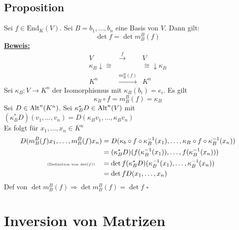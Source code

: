 \subsection{Proposition} %
\label{sub:proposition}
Sei $f \in \text{End}_K (V)$. Sei $B= b_1, \ldots , b_n$ eine Basis von $V$. Dann gilt:
\[
	\det f = \det m_B^B(f)
\]
\underline{\textbf{Beweis:}} \\
\[
	\begin{matrix}
		V & \xrightarrow{f} & V \\
		\kappa_B \downarrow \cong & & \cong \downarrow \kappa_B \\
		K^n & \xrightarrow{m_B^B(f)} & K^n
	\end{matrix}
\]
Sei $ \kappa_B : V \to K^n$ der Isomorphismus mit $\kappa_B (b_i)= e_i$. Es gilt
\[
	\kappa_B \circ f = m_B^B(f)= \kappa_B
\]
Sei $ D \in \operatorname{Alt}^n(K^n)$. Sei $\kappa_B^*D \in \operatorname{Alt}^n(V)$ mit $(\kappa_B^*D)(v_1, \ldots , v_n)= D(\kappa_B v_1, \ldots , \kappa_B v_n)$ \\
Es folgt für $x_1, \ldots , x_n \in K^n$
\begin{align*}
	D( m_B^B(f) x_1, \ldots , m_B^B(f)x_n) &= D(\kappa_b \circ f \circ \kappa_B^{-1}(x_1), \ldots , \kappa_B \circ f \circ \kappa_B ^{-1} (x_n)) \\
	&= (\kappa_B^*D)(f(\kappa_B ^{-1} (x_1)), \ldots , f(\kappa_B ^{-1} (x_n))) \\
	\text{{ \tiny (Definition von $\det (f)$)}} \quad &= \det f ( \kappa_B^*D)(\kappa_B ^{-1} (x_1), \ldots , \kappa_B ^{-1} (x_n))  \\
	&= \det f D(x_1, \ldots , x_n)
\end{align*}
Def von $\det m_B^B(f) \Rightarrow \det m_B^B(f)= \det f$ \hfill \( \square \)

\section{Inversion von Matrizen} %
\label{sec:inversion_von_matrizen}

